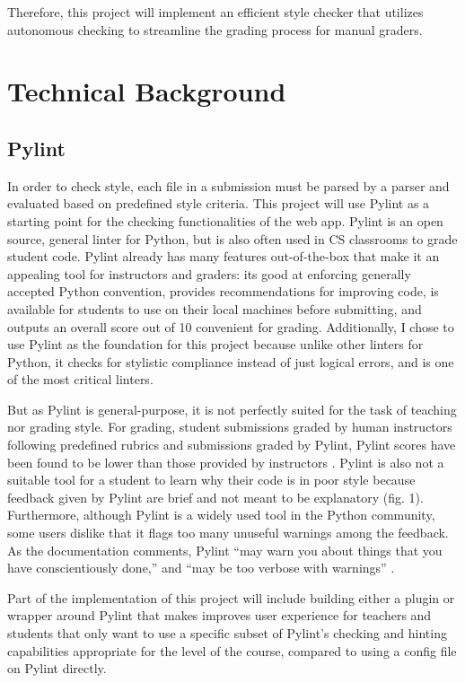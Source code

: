 \documentclass[10pt,twocolumn]{article}
\begin{document}
Therefore, this project will implement an efficient style checker that utilizes autonomous checking to streamline the grading process for manual graders.  


\section{Technical Background}
\subsection{Pylint}
In order to check style, each file in a submission must be parsed by a parser and evaluated based on predefined style criteria. 
This project will use Pylint as a starting point for the checking functionalities of the web app. 
Pylint is an open source, general linter for Python, but is also often used in CS classrooms to grade student code. 
Pylint already has many features out-of-the-box that make it an appealing tool for instructors and graders: its good at enforcing generally accepted Python convention, provides recommendations for improving code, is available for students to use on their local machines before submitting, and outputs an overall score out of 10 convenient for grading. Additionally, I chose to use Pylint as the foundation for this project because unlike other linters for Python, it checks for stylistic compliance instead of just logical errors, and is one of the most critical linters. 

But as Pylint is general-purpose, it is not perfectly suited for the task of teaching nor grading style. 
For grading, student submissions graded by human instructors following predefined rubrics and submissions graded by Pylint, Pylint scores have been found to be lower than those provided by instructors \cite{dasgupta_2017}. 
Pylint is also not a suitable tool for a student to learn why their code is in poor style because feedback given by Pylint are brief and not meant to be explanatory (fig. 1). 
Furthermore, although Pylint is a widely used tool in the Python community, some users dislike that it flags too many unuseful warnings among the feedback. 
As the documentation comments, Pylint “may warn you about things that you have conscientiously done,” and “may be too verbose with warnings” \cite{pylint_documentation_2022}.

Part of the implementation of this project will include building either a plugin or wrapper around Pylint that makes improves user experience for teachers and students that only want to use a specific subset of Pylint's checking and hinting capabilities appropriate for the level of the course, compared to using a config file on Pylint directly. 
\end{document}
